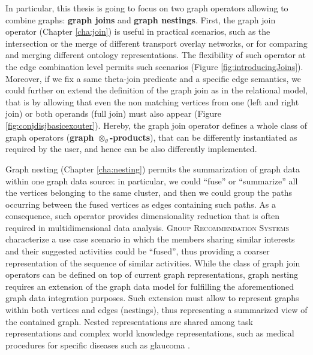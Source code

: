 In particular, this thesis is going to focus on two graph operators allowing to combine graphs: \textbf{graph joins} and \textbf{graph nestings}. First, the graph join operator (Chapter \vref{cha:join}) is useful in practical scenarios, such as the intersection or the merge of different transport overlay networks, or for comparing and merging different ontology representations. The flexibility of such operator at the edge combination level permits such scenarios (Figure \ref{fig:introducingJoins}). Moreover, if we fix a same theta-join predicate and a specific edge semantics, we could further on extend the definition of the graph join as in the relational model, that is by allowing that even the non matching vertices from one (left and right join) or both operands (full join) must also appear (Figure \ref{fig:conjdisjbasicexouter}). Hereby, the graph join operator defines a whole class of graph operators (\textbf{graph $\otimes_\theta$-products}), that can be differently instantiated as required by the user, and hence can be also differently implemented. 

Graph nesting (Chapter \vref{cha:nesting}) permits the summarization of graph data within one graph data source: in particular, we could ``fuse'' or ``summarize'' all the vertices belonging to the same cluster, and then we could group the paths occurring between the fused vertices as edges containing such paths. As a consequence, such operator provides dimensionality reduction that is often required in multidimensional data analysis. \textsc{Group Recommendation Systems} characterize a use case scenario  in which the members sharing similar interests and their suggested activities could be ``fused'', thus providing a coarser representation of the sequence of similar activities.  While the class of graph join operators can be defined on top of current graph representations, graph nesting requires an extension of the graph data model for fulfilling the aforementioned graph data integration purposes. Such extension must allow to represent graphs within both vertices and edges (nestings), thus representing a summarized view of the contained graph. Nested representations are shared among task representations and complex world knowledge representations, such as medical procedures for specific diseases such as glaucoma \cite{NestedGlaucoma}. 
\bigskip

